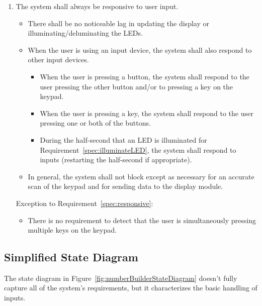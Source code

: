 \begin{enumerate}
    \item \label{spec:responsive} The system shall always be responsive to user input.
        \begin{itemize}
            \item There shall be no noticeable lag in updating the display or illuminating/deluminating the LEDs.
            \item When the user is using an input device, the system shall also respond to other input devices.
                \begin{itemize}
                    \item When the user is pressing a button, the system shall respond to the user pressing the other button and/or to pressing a key on the keypad.
                    \item When the user is pressing a key, the system shall respond to the user pressing one or both of the buttons.
                    \item During the half-second that an LED is illuminated for Requirement~\ref{spec:illuminateLED}, the system shall respond to inputs (restarting the half-second if appropriate).
                \end{itemize}
            \item In general, the system shall not block except as necessary for an accurate scan of the keypad and for sending data to the display module.
        \end{itemize}
        Exception to Requirement~\ref{spec:responsive}:
        \begin{itemize}
            \item There is no requirement to detect that the user is simultaneously pressing multiple keys on the keypad.
        \end{itemize}
\end{enumerate}


\subsection{Simplified State Diagram}

The state diagram in Figure~\ref{fig:numberBuilderStateDiagram} doesn't fully capture all of the system's requirements,
but it characterizes the basic handling of inputs.

